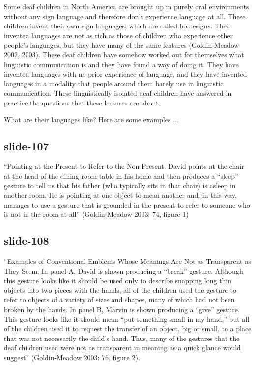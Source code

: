 \documentclass[12pt,\papersize]{extarticle}
\begin{document}
Some deaf children in North America are brought up in purely oral environments without any sign language and therefore don't experience language at all.  These children invent their own sign languages, which are called homesigns.  Their invented languages are not as rich as those of children who experience other people's languages, but they have many of the same features (Goldin-Meadow 2002, 2003).  These deaf children have somehow worked out for themselves what linguistic communication is and they have found a way of doing it.  They have invented languages with no prior experience of language, and they have invented languages in a modality that people around them barely use in linguistic communication.  These linguistically isolated deaf children have answered in practice the questions that these lectures are about.
 
What are their languages like?  Here are some examples ...
 
\subsection{slide-107}
“Pointing at the Present to Refer to the Non-Present.  David points at the chair at the head of the dining room table in his home and then produces a “sleep” gesture to tell us that his father (who typically sits in that chair) is asleep in another room.  He is pointing at one object to mean another and, in this way, manages to use a gesture that is grounded in the present to refer to someone who is not in the room at all” (Goldin-Meadow 2003: 74, figure 1)
 
\subsection{slide-108}
“Examples of Conventional Emblems Whose Meanings Are Not as Transparent as They Seem.  In panel A, David is shown producing a “break” gesture.  Although this gesture looks like it should be used only to describe snapping long thin objects into two pieces with the hands, all of the children used the gesture to refer to objects of a variety of sizes and shapes, many of which had not been broken by the hands.  In panel B, Marvin is shown producing a “give” gesture.  This gesture looks like it should mean “put something small in my hand,” but all of the children used it to request the transfer of an object, big or small, to a place that was not necessarily the child's hand.  Thus, many of the gestures that the deaf children used were not as transparent in meaning as a quick glance would suggest” (Goldin-Meadow 2003: 76, figure 2).
 
\end{document}
